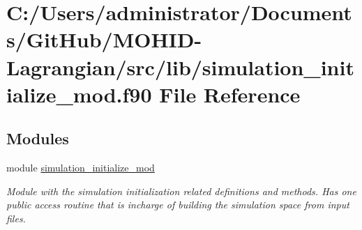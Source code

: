 \hypertarget{simulation__initialize__mod_8f90}{}\section{C\+:/\+Users/administrator/\+Documents/\+Git\+Hub/\+M\+O\+H\+I\+D-\/\+Lagrangian/src/lib/simulation\+\_\+initialize\+\_\+mod.f90 File Reference}
\label{simulation__initialize__mod_8f90}
\subsection*{Modules}
\begin{DoxyCompactItemize}
\item 
module \mbox{\hyperlink{namespacesimulation__initialize__mod}{simulation\+\_\+initialize\+\_\+mod}}
\begin{DoxyCompactList}\small\item\em Module with the simulation initialization related definitions and methods. Has one public access routine that is incharge of building the simulation space from input files. \end{DoxyCompactList}\end{DoxyCompactItemize}
